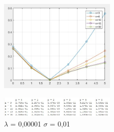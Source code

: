 \begin{figure}[h]
	\centering
	\includegraphics[width=0.5\textwidth]{pl000001s001.png}
\end{figure}

\begin{figure}[h]
	\centering
	\includegraphics[width=0.5\textwidth]{tl000001s001.png}
	\caption{$\lambda$ = 0,00001 $\sigma$ = 0,01}
	\label{fig:lambda = 0,00001 sigma = 0,01}
\end{figure}